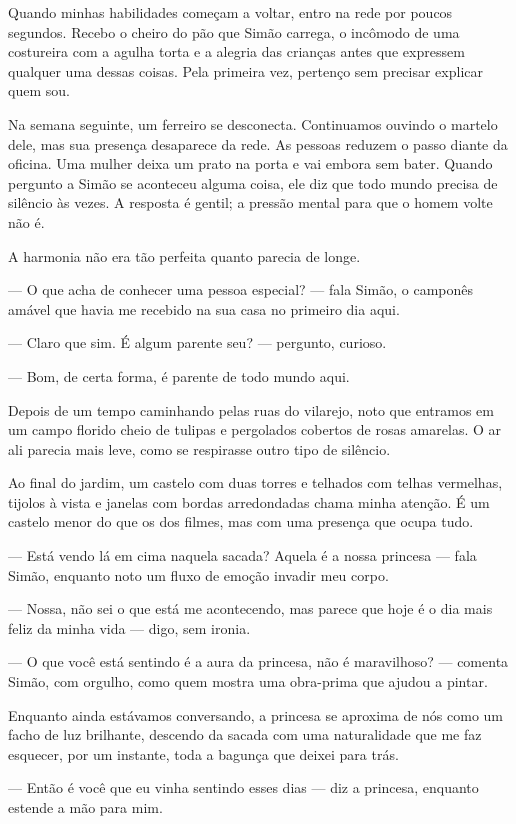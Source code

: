 Quando minhas habilidades começam a voltar, entro na rede por poucos segundos. Recebo o cheiro do pão que Simão carrega, o incômodo de uma costureira com a agulha torta e a alegria das crianças antes que expressem qualquer uma dessas coisas. Pela primeira vez, pertenço sem precisar explicar quem sou.

Na semana seguinte, um ferreiro se desconecta. Continuamos ouvindo o martelo dele, mas sua presença desaparece da rede. As pessoas reduzem o passo diante da oficina. Uma mulher deixa um prato na porta e vai embora sem bater. Quando pergunto a Simão se aconteceu alguma coisa, ele diz que todo mundo precisa de silêncio às vezes. A resposta é gentil; a pressão mental para que o homem volte não é.

A harmonia não era tão perfeita quanto parecia de longe.

— O que acha de conhecer uma pessoa especial? — fala Simão, o camponês amável que havia me recebido na sua casa no primeiro dia aqui.

— Claro que sim. É algum parente seu? — pergunto, curioso.

— Bom, de certa forma, é parente de todo mundo aqui.

Depois de um tempo caminhando pelas ruas do vilarejo, noto que entramos em um campo florido cheio de tulipas e pergolados cobertos de rosas amarelas. O ar ali parecia mais leve, como se respirasse outro tipo de silêncio.

Ao final do jardim, um castelo com duas torres e telhados com telhas vermelhas, tijolos à vista e janelas com bordas arredondadas chama minha atenção. É um castelo menor do que os dos filmes, mas com uma presença que ocupa tudo.

— Está vendo lá em cima naquela sacada? Aquela é a nossa princesa — fala Simão, enquanto noto um fluxo de emoção invadir meu corpo.

— Nossa, não sei o que está me acontecendo, mas parece que hoje é o dia mais feliz da minha vida — digo, sem ironia.

— O que você está sentindo é a aura da princesa, não é maravilhoso? — comenta Simão, com orgulho, como quem mostra uma obra-prima que ajudou a pintar.

Enquanto ainda estávamos conversando, a princesa se aproxima de nós como um facho de luz brilhante, descendo da sacada com uma naturalidade que me faz esquecer, por um instante, toda a bagunça que deixei para trás.

— Então é você que eu vinha sentindo esses dias — diz a princesa, enquanto estende a mão para mim.

